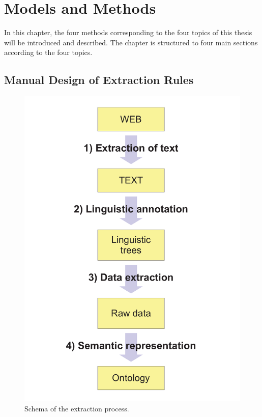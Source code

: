 \chapter{Models and Methods} \label{sec:ch_methods} 


In this chapter, the four methods corresponding to the four topics of this thesis will be introduced and described. The chapter is structured to four main sections according to the four topics. 



\section{Manual Design of Extraction Rules} \label{sec:manual_methods}
\graphicspath{{../img/ch50/}}

\begin{figure}
\vspace{-0.5cm}
\centerline{\includegraphics[width=\hsize]{ap_schema}}
\caption{Schema of the extraction process.}
\label{fig:manual_ap_schema}
\end{figure}


